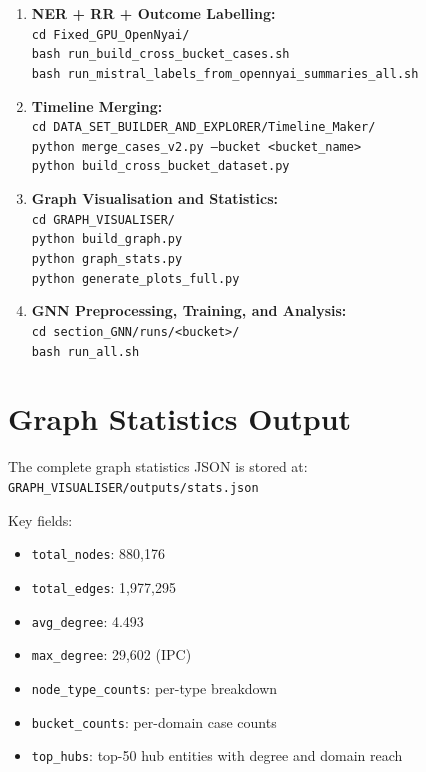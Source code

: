 \documentclass[12pt,a4paper]{report}
\begin{document}
\begin{enumerate}
  \item \textbf{NER + RR + Outcome Labelling:}\\
    \texttt{cd Fixed\_GPU\_OpenNyai/}\\
    \texttt{bash run\_build\_cross\_bucket\_cases.sh}\\
    \texttt{bash run\_mistral\_labels\_from\_opennyai\_summaries\_all.sh}

  \item \textbf{Timeline Merging:}\\
    \texttt{cd DATA\_SET\_BUILDER\_AND\_EXPLORER/Timeline\_Maker/}\\
    \texttt{python merge\_cases\_v2.py --bucket <bucket\_name>}\\
    \texttt{python build\_cross\_bucket\_dataset.py}

  \item \textbf{Graph Visualisation and Statistics:}\\
    \texttt{cd GRAPH\_VISUALISER/}\\
    \texttt{python build\_graph.py}\\
    \texttt{python graph\_stats.py}\\
    \texttt{python generate\_plots\_full.py}

  \item \textbf{GNN Preprocessing, Training, and Analysis:}\\
    \texttt{cd section\_GNN/runs/<bucket>/}\\
    \texttt{bash run\_all.sh}
\end{enumerate}

\chapter{Graph Statistics Output}
\label{app:graph_stats}

The complete graph statistics JSON is stored at:\\
\texttt{GRAPH\_VISUALISER/outputs/stats.json}

Key fields:
\begin{itemize}
  \item \texttt{total\_nodes}: 880,176
  \item \texttt{total\_edges}: 1,977,295
  \item \texttt{avg\_degree}: 4.493
  \item \texttt{max\_degree}: 29,602 (IPC)
  \item \texttt{node\_type\_counts}: per-type breakdown
  \item \texttt{bucket\_counts}: per-domain case counts
  \item \texttt{top\_hubs}: top-50 hub entities with degree and domain reach
\end{itemize}
\end{document}
